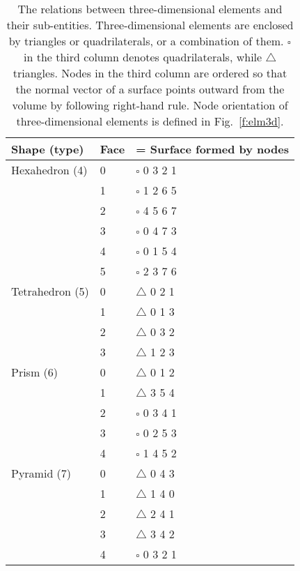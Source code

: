 \documentclass[11pt,dvips]{article}
\newcommand{\topcaption}{%
\setlength{\abovecaptionskip}{0pt}%
\setlength{\belowcaptionskip}{10pt}%
\caption}
\numberwithin{equation}{section}
\begin{document}
%
\begin{table}[h]
\centering

\topcaption{
%
The relations between three-dimensional elements and their sub-entities.
Three-dimensional elements are enclosed by triangles or quadrilaterals, or a
combination of them.  $\square$ in the third column denotes quadrilaterals,
while $\triangle$ triangles.  Nodes in the third column are ordered so that the
normal vector of a surface points outward from the volume by following
right-hand rule.  Node orientation of three-dimensional elements is defined in
Fig.~\ref{f:elm3d}.
%
}

\label{t:subent3d}
\begin{tabular}{lll}
\toprule
Shape (type)    & Face & = Surface formed by nodes \\
\midrule
Hexahedron (4)  & 0    & $\square$ 0 3 2 1         \\
                & 1    & $\square$ 1 2 6 5         \\
                & 2    & $\square$ 4 5 6 7         \\
                & 3    & $\square$ 0 4 7 3         \\
                & 4    & $\square$ 0 1 5 4         \\
                & 5    & $\square$ 2 3 7 6         \\
\midrule
Tetrahedron (5) & 0    & $\triangle$ 0 2 1         \\
                & 1    & $\triangle$ 0 1 3         \\
                & 2    & $\triangle$ 0 3 2         \\
                & 3    & $\triangle$ 1 2 3         \\
\midrule
Prism (6)       & 0    & $\triangle$ 0 1 2         \\
                & 1    & $\triangle$ 3 5 4         \\
                & 2    & $\square$ 0 3 4 1         \\
                & 3    & $\square$ 0 2 5 3         \\
                & 4    & $\square$ 1 4 5 2         \\
\midrule
Pyramid (7)     & 0    & $\triangle$ 0 4 3         \\
                & 1    & $\triangle$ 1 4 0         \\
                & 2    & $\triangle$ 2 4 1         \\
                & 3    & $\triangle$ 3 4 2         \\
                & 4    & $\square$ 0 3 2 1         \\
\bottomrule
\end{tabular}
\end{table}
%
\end{document}
